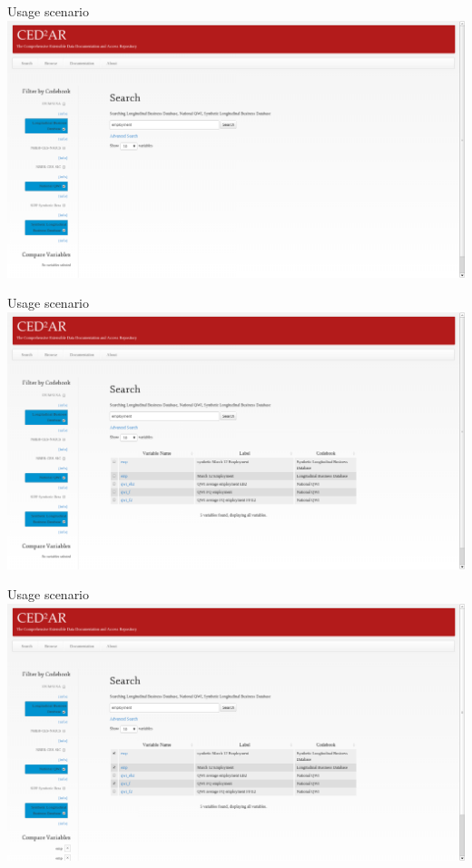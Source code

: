 \begin{frame}{Usage scenario}
\includegraphics[width=1.1\linewidth]{Screenshot_2013-11-04_12:42:19.png}
\end{frame}
\begin{frame}{Usage scenario}
\includegraphics[width=1.1\linewidth]{Screenshot_2013-11-04_12:42:24.png}
\end{frame}
\begin{frame}{Usage scenario}
\includegraphics[width=1.1\textwidth]{Screenshot_2013-11-04_12:42:38.png}
\end{frame}
